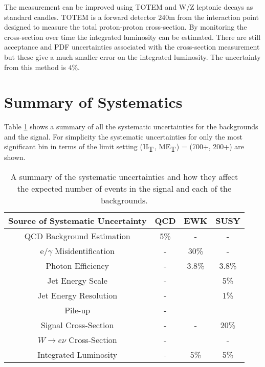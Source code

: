 The measurement can be improved using TOTEM and W/Z leptonic decays as standard
candles. TOTEM is a forward detector 240m from the interaction point designed to
measure the total proton-proton cross-section. By monitoring the cross-section
over time the integrated luminosity can be estimated. There are still acceptance
and PDF uncertainties associated with the cross-section measurement but these 
give a much smaller error on the integrated luminosity. The uncertainty from
this method is $4\%$.

\section{Summary of Systematics}

Table \ref{tab:Systematics_Summary} shows a summary of all the systematic
uncertainties for the backgrounds and the signal. For simplicity the systematic
uncertainties for only the most significant bin in terms of the limit setting 
($\mbox{H}_{\mbox{T}}$, $\mbox{ME}_{\mbox{T}}$) = (700+, 200+) are shown.

\begin{table}
\begin{center}
\begin{tabular}{|c|c|c|c|}
\hline
{\bf Source of Systematic Uncertainty} & {\bf QCD} & {\bf EWK} & {\bf SUSY} \\
\hline
QCD Background Estimation & 5\% & - & - \\
\hline
e/$\gamma$ Misidentification & - & 30\% & - \\
\hline
Photon Efficiency & - & 3.8\% & 3.8\% \\
\hline
Jet Energy Scale & - & & 5\% \\
\hline
Jet Energy Resolution & - & & 1\% \\
\hline
Pile-up & - & & \\
\hline
Signal Cross-Section & - & - & 20\% \\
\hline
$W\rightarrow e\nu$ Cross-Section & - &  & - \\
\hline
Integrated Luminosity & - & 5\% & 5\% \\
\hline
\end{tabular}
\end{center}
\caption{A summary of the systematic uncertainties and how they affect the
expected number of events in the signal and each of the backgrounds.}
\label{tab:Systematics_Summary}
\end{table}
